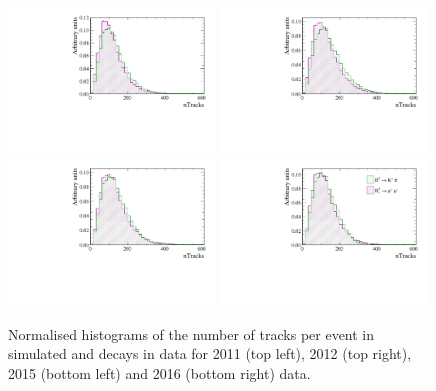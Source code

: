 \begin{figure}[tbp]
  \centering
    \includegraphics[width=0.49\textwidth]{./Figs/LifetimeMeasurement/nTracks_2011_Bs2MuMu_Bd2KPi.pdf}
    \includegraphics[width=0.49\textwidth]{./Figs/LifetimeMeasurement/nTracks_2012_Bs2MuMu_Bd2KPi.pdf}
    \includegraphics[width=0.49\textwidth]{./Figs/LifetimeMeasurement/nTracks_2015_Bs2MuMu_Bd2KPi.pdf}
    \includegraphics[width=0.49\textwidth]{./Figs/LifetimeMeasurement/nTracks_2016_Bs2MuMu_Bd2KPi.pdf}
  \caption{Normalised histograms of the number of tracks per event in simulated \bdkpi and \bsmumu decays in data for 2011 (top left), 2012 (top right), 2015 (bottom left) and 2016 (bottom right) data. }
  \label{fig:BsmmVsBdToKpinTracks}
\end{figure}

